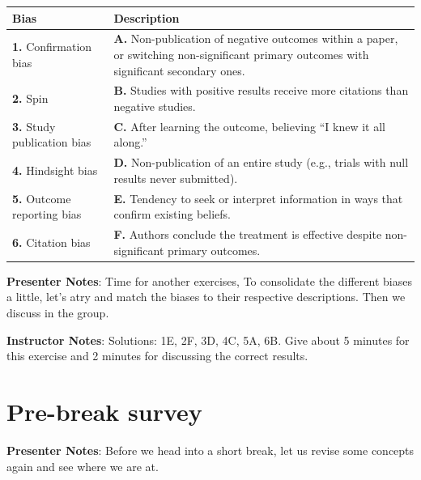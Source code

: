 \documentclass[
  letterpaper,
  DIV=11,
  numbers=noendperiod]{scrartcl}
\newcounter{none} %
\begin{document}
{\def\LTcaptype{none} %
\begin{longtable}[]{@{}
  >{\raggedright\arraybackslash}p{}
  >{\raggedright\arraybackslash}p{}@{}}
\toprule\noalign{}
\begin{minipage}[b]{\linewidth}\raggedright
\textbf{Bias}
\end{minipage} & \begin{minipage}[b]{\linewidth}\raggedright
\textbf{Description}
\end{minipage} \\
\midrule\noalign{}
\endhead
\bottomrule\noalign{}
\endlastfoot
\textbf{1.} Confirmation bias & \textbf{A.} Non-publication of negative
outcomes within a paper, or switching non-significant primary outcomes
with significant secondary ones. \\
\textbf{2.} Spin & \textbf{B.} Studies with positive results receive
more citations than negative studies. \\
\textbf{3.} Study publication bias & \textbf{C.} After learning the
outcome, believing ``I knew it all along.'' \\
\textbf{4.} Hindsight bias & \textbf{D.} Non-publication of an entire
study (e.g., trials with null results never submitted). \\
\textbf{5.} Outcome reporting bias & \textbf{E.} Tendency to seek or
interpret information in ways that confirm existing beliefs. \\
\textbf{6.} Citation bias & \textbf{F.} Authors conclude the treatment
is effective despite non-significant primary outcomes. \\
\end{longtable}
}

\textbf{Presenter Notes}: Time for another exercises, To consolidate the
different biases a little, let's atry and match the biases to their
respective descriptions. Then we discuss in the group.

\textbf{Instructor Notes}: Solutions: 1E, 2F, 3D, 4C, 5A, 6B. Give about
5 minutes for this exercise and 2 minutes for discussing the correct
results.

\section{Pre-break survey}\label{pre-break-survey}

\textbf{Presenter Notes}: Before we head into a short break, let us
revise some concepts again and see where we are at.
\end{document}

